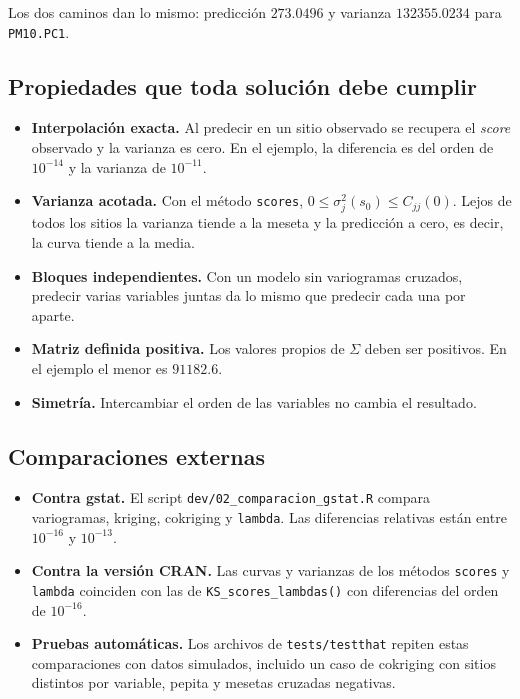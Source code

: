 \documentclass[11pt,a4paper]{article}
\newcommand{\code}[1]{\texttt{#1}}
\begin{document}
\noindent
Los dos caminos dan lo mismo: predicción $273.0496$ y varianza $132355.0234$
para \code{PM10.PC1}.

\subsection{Propiedades que toda solución debe cumplir}

\begin{itemize}
  \item \textbf{Interpolación exacta.} Al predecir en un sitio observado se
        recupera el \emph{score} observado y la varianza es cero. En el
        ejemplo, la diferencia es del orden de $10^{-14}$ y la varianza de
        $10^{-11}$.
  \item \textbf{Varianza acotada.} Con el método \code{scores}, $0 \le
        \sigma_j^2(s_0) \le C_{jj}(0)$. Lejos de todos los sitios la varianza
        tiende a la meseta y la predicción a cero, es decir, la curva tiende a
        la media.
  \item \textbf{Bloques independientes.} Con un modelo sin variogramas
        cruzados, predecir varias variables juntas da lo mismo que predecir
        cada una por aparte.
  \item \textbf{Matriz definida positiva.} Los valores propios de $\Sigma$
        deben ser positivos. En el ejemplo el menor es $91182.6$.
  \item \textbf{Simetría.} Intercambiar el orden de las variables no cambia
        el resultado.
\end{itemize}

\subsection{Comparaciones externas}

\begin{itemize}
  \item \textbf{Contra gstat.} El script \code{dev/02\_comparacion\_gstat.R}
        compara variogramas, kriging, cokriging y \code{lambda}. Las
        diferencias relativas están entre $10^{-16}$ y $10^{-13}$.
  \item \textbf{Contra la versión CRAN.} Las curvas y varianzas de los
        métodos \code{scores} y \code{lambda} coinciden con las de
        \code{KS\_scores\_lambdas()} con diferencias del orden de $10^{-16}$.
  \item \textbf{Pruebas automáticas.} Los archivos de \code{tests/testthat}
        repiten estas comparaciones con datos simulados, incluido un caso de
        cokriging con sitios distintos por variable, pepita y mesetas
        cruzadas negativas.
\end{itemize}
\end{document}
